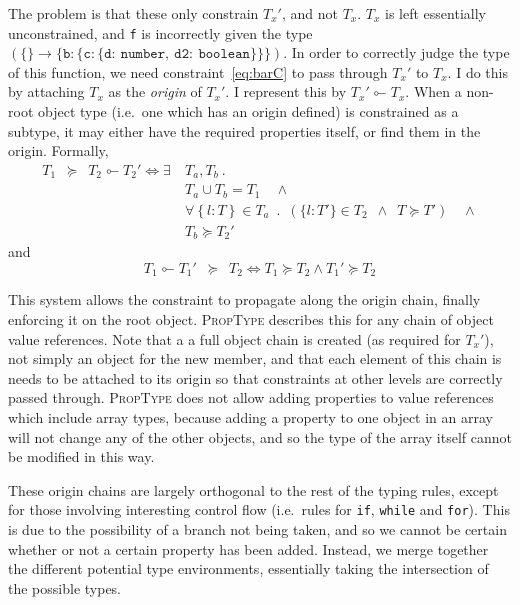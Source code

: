 \documentclass[12pt,a4paper,twoside,openright]{report}
\newcommand*{\js}{\texttt}
\newcommand*{\orig}{\ensuremath{\!\multimapinv\!}}
\begin{document}
The problem is that these only constrain $T_x'$, and not $T_x$. $T_x$ is
left essentially unconstrained, and \js{f} is incorrectly given the type
$\mathtt{(\mathtt{\{\} \rightarrow \{b:\{c:\{d:\ number,\ d2:\ boolean\}\}\}})}$. In order to
correctly judge the type of this function, we need constraint~\eqref{eq:barC}
to pass through $T_x'$ to $T_x$. I do this by attaching $T_x$ as the
\textit{origin} of $T_x'$. I represent this by $T_x'\orig T_x$.  When a
non-root object type (i.e.~one which has an origin defined) is constrained as a
subtype, it may either have the required properties itself, or find them in the
origin. Formally,
\begin{equation}
  \begin{split}
	T_1\enspace \succeq\enspace T_2\orig T_2' \iff  \exists\ & T_a, T_b\ .\\
	& T_a\cup T_b = T_1 \quad\land  \\
	& \forall \left\{l: T\right\} \in T_a \enspace.\enspace (\{l: T'\}\in T_2\enspace \land \enspace T \succeq T') \quad\land \\
	& T_b \succeq T_2'
  \end{split}
\end{equation}
and
\begin{equation}
  T_1\orig T_1'\enspace \succeq \enspace T_2 \iff T_1\succeq T_2 \land T_1' \succeq T_2
\end{equation}

This system allows the constraint to propagate along the origin chain, finally
enforcing it on the root object. \textsc{PropType} describes this for any chain of
object value references. Note that a a full object chain is created (as
required for $T_x'$), not simply an object for the new member, and that each
element of this chain is needs to be attached to its origin so that constraints
at other levels are correctly passed through. \textsc{PropType} does not allow adding
properties to value references which include array types, because adding a
property to one object in an array will not change any of the other objects,
and so the type of the array itself cannot be modified in this way.

These origin chains are largely orthogonal to the rest of the typing rules,
except for those involving interesting control flow (i.e.~rules for
\js{if}, \js{while} and \js{for}). This is due to the possibility
of a branch not being taken, and so we cannot be certain whether or not a
certain property has been added. Instead, we merge together the different
potential type environments, essentially taking the intersection of the
possible types.
\end{document}
